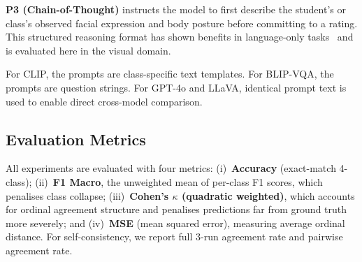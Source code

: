 \textbf{P3 (Chain-of-Thought)} instructs the model to first describe
the student's or class's observed facial expression and body posture
before committing to a rating.  This structured reasoning format has
shown benefits in language-only tasks~\cite{wei2022chain} and is
evaluated here in the visual domain.

For CLIP, the prompts are class-specific text templates.  For BLIP-VQA,
the prompts are question strings.  For GPT-4o and LLaVA, identical
prompt text is used to enable direct cross-model comparison.

\subsection{Evaluation Metrics}

All experiments are evaluated with four metrics: (i)~\textbf{Accuracy}
(exact-match 4-class); (ii)~\textbf{F1 Macro}, the unweighted mean of
per-class F1 scores, which penalises class collapse; (iii)~\textbf{Cohen's
$\kappa$ (quadratic weighted)}, which accounts for ordinal agreement
structure and penalises predictions far from ground truth more severely;
and (iv)~\textbf{MSE} (mean squared error), measuring average ordinal
distance.  For self-consistency, we report full 3-run agreement rate
and pairwise agreement rate.
